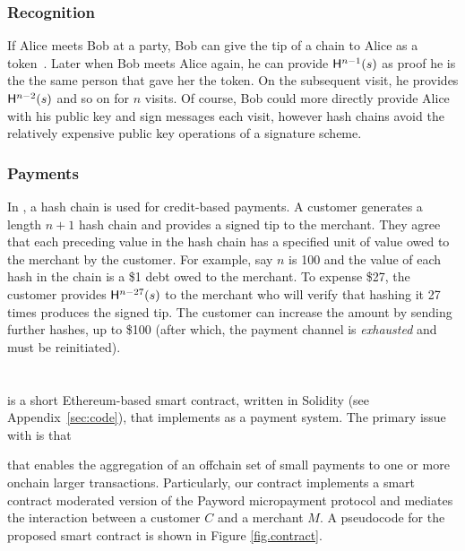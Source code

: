 \subsubsection{Recognition}

 If Alice meets Bob at a party, Bob can give the tip of a chain to Alice as a token~\cite{ABC+98}. Later when Bob meets Alice again, he can provide $\mathsf{H}^{n-1}(s)$ as proof he is the the same person that gave her the token. On the subsequent visit, he provides $\mathsf{H}^{n-2}(s)$ and so on for $n$ visits. Of course, Bob could more directly provide Alice with his public key and sign messages each visit, however hash chains avoid the relatively expensive public key operations of a signature scheme. 

\subsubsection{Payments}

In \pw, a hash chain is used for credit-based payments. A customer generates a length $n+1$ hash chain and provides a signed tip to the merchant. They agree that each preceding value in the hash chain has a specified unit of value owed to the merchant by the customer. For example, say $n$ is 100 and the value of each hash in the chain is a \$1 debt owed to the merchant. To expense \$27, the customer provides $\mathsf{H}^{n-27}(s)$ to the merchant who will verify that hashing it 27 times produces the signed tip. The customer can increase the amount by sending further hashes, up to \$100 (after which, the payment channel is \textit{exhausted} and must be reinitiated).


\section{\ew}

\ew is a short Ethereum-based smart contract, written in Solidity (see Appendix~\ref{sec:code}), that implements \pw as a payment system. The primary issue with \pw is that 

 that enables the aggregation of an offchain set of small payments to one or more onchain larger transactions. Particularly, our contract implements a smart contract moderated version of the Payword micropayment protocol and mediates the interaction between a customer $C$ and a merchant $M$. A pseudocode for the proposed smart contract is shown in Figure \ref{fig.contract}. 



